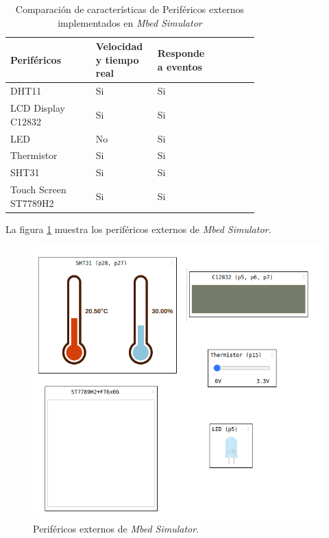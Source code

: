 \begin{table}[h]
\centering
\caption[Comparación de características de Periféricos externos implementados en \textit{Mbed Simulator}]{Comparación de características de Periféricos externos implementados en \textit{Mbed Simulator}}
\begin{tabular}{p{0.30\linewidth} p{0.14\linewidth}  p{0.14\linewidth}  p{0.14\linewidth}}
\toprule
\textbf{Periféricos} 
& \textbf{Velocidad y tiempo real}
& \textbf{Responde a eventos}
\\
\midrule
DHT11 & Si & Si  \\
LCD Display C12832 & Si & Si  \\
LED & No & Si \\
Thermistor & Si & Si \\
SHT31 & Si & Si \\
Touch Screen ST7789H2 & Si & Si \\
\bottomrule
\hline
\end{tabular}
\label{tab:perifericosExternosMBED}
\end{table}

La figura \ref{fig:perifericosMbed} muestra los periféricos externos de \textit{Mbed Simulator}.
\hfill \break
\hfill \break
\hfill \break
\hfill \break
\hfill \break

\begin{figure}[ht]
	\centering
	\includegraphics[scale=.70]{./Figures/perifericosMBED.png}
	\caption{Periféricos externos de \textit{Mbed Simulator}.}
	\label{fig:perifericosMbed}
\end{figure}

